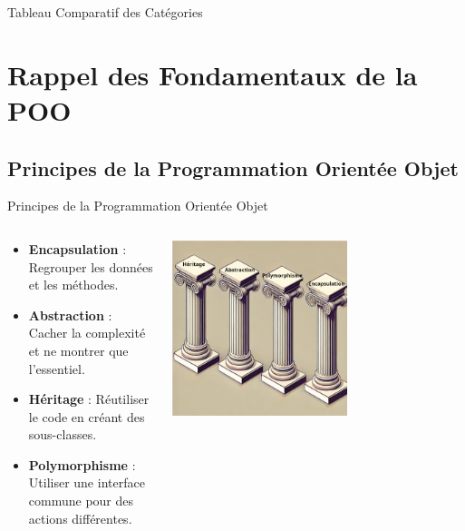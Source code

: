 \documentclass[aspectratio=169]{beamer}
\begin{document}
\begin{frame}{Tableau Comparatif des Catégories}

\end{frame}

\section{Rappel des Fondamentaux de la POO}

\subsection{Principes de la Programmation Orientée Objet}

\begin{frame}{Principes de la Programmation Orientée Objet}
    \begin{columns}
        \begin{column}{0.6\textwidth}
            \begin{itemize}
                \item \textbf{Encapsulation} : Regrouper les données et les méthodes.
                \item \textbf{Abstraction} : Cacher la complexité et ne montrer que l'essentiel.
                \item \textbf{Héritage} : Réutiliser le code en créant des sous-classes.
                \item \textbf{Polymorphisme} : Utiliser une interface commune pour des actions différentes.
            \end{itemize}
        \end{column}
        \begin{column}{0.4\textwidth}
            \pause
            \begin{center}
                \includegraphics[width=0.6\textwidth]{pic/poo_principles.png}
            \end{center}
        \end{column}
    \end{columns}
\end{frame}
\end{document}
